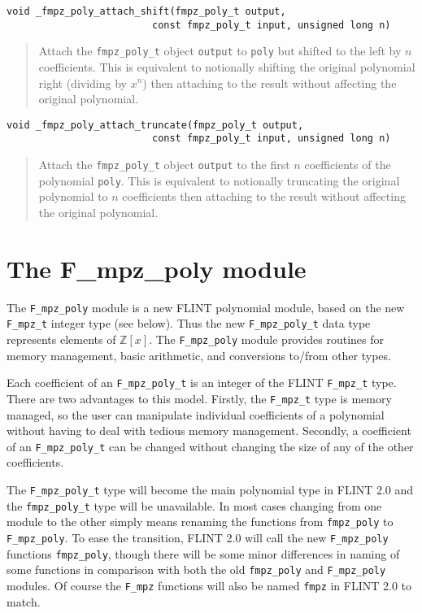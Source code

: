 \documentclass[a4paper,10pt]{article}
\newcommand{\Z}{\mathbb{Z}}
\newcommand{\code}{\lstinline}
\begin{document}
\begin{lstlisting}
void _fmpz_poly_attach_shift(fmpz_poly_t output, 
                         const fmpz_poly_t input, unsigned long n)
\end{lstlisting}
\begin{quote}
Attach the \code{fmpz_poly_t} object \code{output} to \code{poly} but shifted to the left by $n$ coefficients. This is equivalent to notionally shifting the original polynomial right (dividing by $x^n$) then attaching to the result without affecting the original polynomial.
\end{quote}

\begin{lstlisting}
void _fmpz_poly_attach_truncate(fmpz_poly_t output, 
                         const fmpz_poly_t input, unsigned long n)
\end{lstlisting}
\begin{quote}
Attach the \code{fmpz_poly_t} object \code{output} to the first $n$ coefficients of the polynomial \code{poly}. This is equivalent to notionally truncating the original polynomial to $n$ coefficients then attaching to the result without affecting the original polynomial.
\end{quote}

\section{The F\_mpz\_poly module}

The \code{F_mpz_poly} module is a new FLINT polynomial module, based on the new \code{F_mpz_t} integer type
(see below). Thus the new \code{F_mpz_poly_t} data type represents elements of $\Z[x]$. The \code{F_mpz_poly} 
module provides routines for memory management, basic arithmetic, and conversions to/from other types.

Each coefficient of an \code{F_mpz_poly_t} is an integer of the FLINT \code{F_mpz_t} type. There are two
advantages to this model. Firstly, the \code{F_mpz_t} type is memory managed, so the user can manipulate
individual coefficients of a polynomial without having to deal with tedious memory management. Secondly,
a coefficient of an \code{F_mpz_poly_t} can be changed without changing the size of any of the other
coefficients. 

The \code{F_mpz_poly_t} type will become the main polynomial type in FLINT 2.0 and the \code{fmpz_poly_t}
type will be unavailable. In most cases changing from one module to the other simply means renaming the
functions from \code{fmpz_poly} to \code{F_mpz_poly}. To ease the transition, FLINT 2.0 will call the 
new \code{F_mpz_poly} functions \code{fmpz_poly}, though there will be some minor differences in naming
of some functions in comparison with both the old \code{fmpz_poly} and \code{F_mpz_poly} modules. Of 
course the \code{F_mpz} functions will also be named \code{fmpz} in FLINT 2.0 to match.
\end{document}
